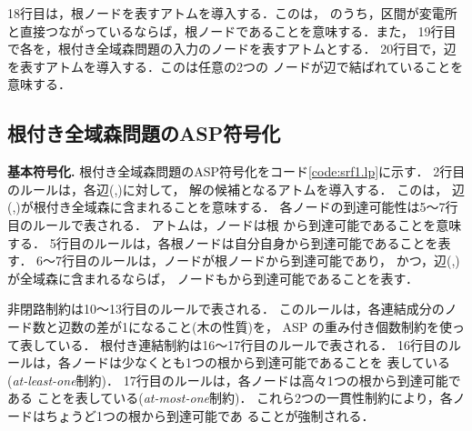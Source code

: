 18行目は，根ノードを表すアトムを導入する．このは，
のうち，区間が変電所と直接つながっているならば，根ノードであることを意味する．また，
19行目で各を，根付き全域森問題の入力のノードを表すアトムとする．
20行目で，辺を表すアトムを導入する．このは任意の2つの
ノードが辺で結ばれていることを意味する．






\subsection{根付き全域森問題のASP符号化}
\textbf{基本符号化.}
根付き全域森問題のASP符号化をコード\ref{code:srf1.lp}に示す．
2行目のルールは，各辺(,)に対して，
解の候補となるアトムを導入する．
このは，
辺(,)が根付き全域森に含まれることを意味する．
%
各ノードの到達可能性は5～7行目のルールで表される．
アトムは，ノードは根
から到達可能であることを意味する．
5行目のルールは，各根ノードは自分自身から到達可能であることを表す．
6～7行目のルールは，ノードが根ノードから到達可能であり，
かつ，辺(,)が全域森に含まれるならば，
ノードもから到達可能であることを表す．

非閉路制約は10～13行目のルールで表される．
このルールは，各連結成分のノード数と辺数の差が1になること(木の性質)を，
ASP の重み付き個数制約を使って表している．
%
根付き連結制約は16～17行目のルールで表される．
16行目のルールは，各ノードは少なくとも1つの根から到達可能であることを
表している(\textit{at-least-one}制約)．
17行目のルールは，各ノードは高々1つの根から到達可能である
ことを表している(\textit{at-most-one}制約)．
これら2つの一貫性制約により，各ノードはちょうど1つの根から到達可能であ
ることが強制される．

